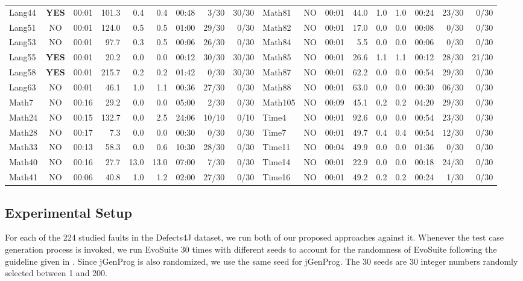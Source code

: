 \documentclass[]{sig-alternate}
\begin{document}
\begin{table*}[htbp]
\begin{tabular}{|l|c|c|r|r|r|c|r|r||l|c|c|r|r|r|c|r|r|}
Lang44 & \bf{YES} & 00:01 & 101.3 & 0.4 & 0.4 & 00:48 & 3/30 & 30/30 & Math81 & NO & 00:01 & 44.0 & 1.0 & 1.0 & 00:24 & 23/30 & 0/30 \\
Lang51 & NO & 00:01 & 124.0 & 0.5 & 0.5 & 01:00 & 29/30 & 0/30 & Math82 & NO & 00:01 & 17.0 & 0.0 & 0.0 & 00:08 & 0/30 & 0/30\\ 
Lang53 & NO & 00:01 & 97.7 & 0.3 & 0.5 & 00:06 & 26/30 & 0/30 & Math84 & NO & 00:01 & 5.5 & 0.0 & 0.0 & 00:06 & 0/30 & 0/30 \\
Lang55 & \bf{YES} & 00:01 & 20.2 & 0.0 & 0.0 & 00:12 & 30/30 & 30/30 & Math85 & NO & 00:01 & 26.6 & 1.1 & 1.1 & 00:12 & 28/30 & 21/30\\
Lang58 & \bf{YES} & 00:01 & 215.7 & 0.2 & 0.2 & 01:42 & 0/30 & 30/30 & Math87 & NO & 00:01 & 62.2 & 0.0 & 0.0 & 00:54 & 29/30 & 0/30\\
Lang63 & NO & 00:01 & 46.1 & 1.0 & 1.1 & 00:36 & 27/30 & 0/30 & Math88 & NO & 00:01 & 63.0 & 0.0 & 0.0 & 00:30 & 06/30 & 0/30\\
Math7 & NO & 00:16 & 29.2 & 0.0 & 0.0 & 05:00 & 2/30 & 0/30 & Math105 & NO & 00:09 & 45.1 & 0.2 & 0.2 & 04:20 & 29/30 & 0/30\\
Math24 & NO & 00:15 & 132.7 & 0.0 & 2.5 & 24:06 & 10/10 & 0/10 & Time4 & NO & 00:01 & 92.6 & 0.0 & 0.0 & 00:54 & 23/30 & 0/30\\
Math28 & NO & 00:17 & 7.3 & 0.0 & 0.0 & 00:30 & 0/30 & 0/30 & Time7 & NO & 00:01 & 49.7 & 0.4 & 0.4 & 00:54 & 12/30 & 0/30 \\
Math33 & NO & 00:13 & 58.3 & 0.0 & 0.6 & 10:30 & 28/30 & 0/30 & Time11 & NO & 00:04 & 49.9 & 0.0 & 0.0 & 01:36 & 0/30 & 0/30\\
Math40 & NO & 00:16 & 27.7 & 13.0 & 13.0 & 07:00 & 7/30 & 0/30 & Time14 & NO & 00:01 & 22.9 & 0.0 & 0.0 & 00:18 & 24/30 & 0/30\\
Math41 & NO & 00:06 & 40.8 & 1.0 & 1.2 & 02:00 & 27/30 & 0/30 & Time16 & NO & 00:01 & 49.2 & 0.2 & 0.2 & 00:24 & 1/30 & 0/30\\
    \hline
  \end{tabular}
\end{table*}



\subsection{Experimental Setup}

For each of the 224 studied faults in the Defects4J dataset, we run both of our proposed approaches against it. Whenever the test case generation process is invoked, we run EvoSuite 30 times with different seeds to account for the randomness of EvoSuite following the guideline given in \cite{Arcuri:2011:PGU:1985793.1985795}. Since jGenProg is also randomized, we use the same seed for jGenProg. The 30 seeds are 30 integer numbers randomly selected between 1 and 200. 
\end{document}
